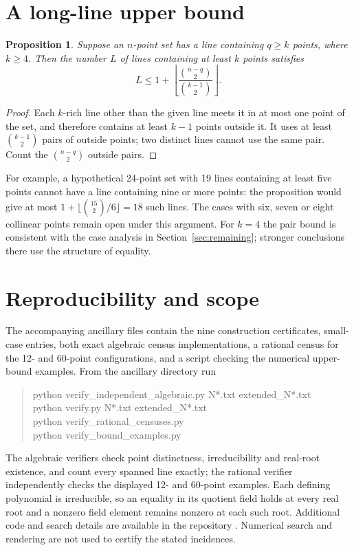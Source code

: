 \documentclass[11pt,a4paper]{amsart}
\newtheorem{proposition}[theorem]{Proposition}
\theoremstyle{remark}\newtheorem{remark}[theorem]{Remark}
\begin{document}
\section{A long-line upper bound}
\begin{proposition}\label{prop:longline}
Suppose an $n$-point set has a line containing $q\ge k$ points, where $k\ge4$. Then the number $L$ of lines containing at least $k$ points satisfies
\[
 L\le 1+\left\lfloor\frac{\binom{n-q}{2}}{\binom{k-1}{2}}\right\rfloor.
\]
\end{proposition}
\begin{proof}
Each $k$-rich line other than the given line meets it in at most one point of the set, and therefore contains at least $k-1$ points outside it. It uses at least $\binom{k-1}{2}$ pairs of outside points; two distinct lines cannot use the same pair. Count the $\binom{n-q}{2}$ outside pairs.
\end{proof}
For example, a hypothetical 24-point set with 19 lines containing at least five points cannot have a line containing nine or more points: the proposition would give at most $1+\lfloor\binom{15}{2}/6\rfloor=18$ such lines. The cases with six, seven or eight collinear points remain open under this argument. For $k=4$ the pair bound is consistent with the case analysis in Section~\ref{sec:remaining}; stronger conclusions there use the structure of equality.

\section{Reproducibility and scope}
The accompanying ancillary files contain the nine construction certificates, small-case entries, both exact algebraic census implementations, a rational census for the 12- and 60-point configurations, and a script checking the numerical upper-bound examples. From the ancillary directory run
\begin{quote}\ttfamily\small
python verify\_independent\_algebraic.py N*.txt extended\_N*.txt\\
python verify.py N*.txt extended\_N*.txt\\
python verify\_rational\_censuses.py\\
python verify\_bound\_examples.py
\end{quote}
The algebraic verifiers check point distinctness, irreducibility and real-root existence, and count every spanned line exactly; the rational verifier independently checks the displayed 12- and 60-point examples. Each defining polynomial is irreducible, so an equality in its quotient field holds at every real root and a nonzero field element remains nonzero at each such root. Additional code and search details are available in the repository \cite{Repository}. Numerical search and rendering are not used to certify the stated incidences.
\end{document}
